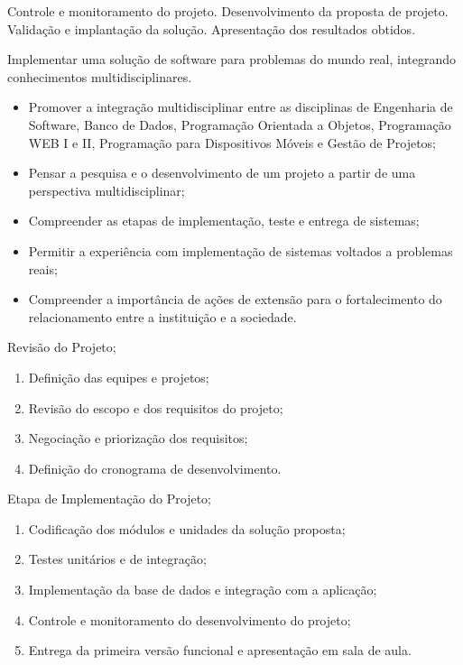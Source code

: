 \begin{pud}
	
	\ementa
	Controle e monitoramento do projeto. Desenvolvimento da proposta de projeto. Validação e implantação da solução. Apresentação dos resultados obtidos.

	\objetivos
	Implementar uma solução de software para problemas do mundo real, integrando conhecimentos multidisciplinares.
	
	\begin{itemize}
	  \item Promover a integração multidisciplinar entre as disciplinas de Engenharia de Software, Banco de Dados, Programação Orientada a Objetos, Programação WEB I e II, Programação para Dispositivos Móveis e Gestão de Projetos;
		\item Pensar a pesquisa e o desenvolvimento de um projeto a partir de uma perspectiva multidisciplinar;
		\item Compreender as etapas de implementação, teste e entrega de sistemas;
		\item Permitir a experiência com implementação de sistemas voltados a problemas reais;
		\item Compreender a importância de ações de extensão para o fortalecimento do relacionamento entre a instituição e a sociedade.
	\end{itemize}


	\programa
	\begin{description}[itemsep=0em]
 		\item[UNIDADE I:] Revisão do Projeto; 
 	    \begin{enumerate}[itemsep=0em, topsep=0em]
 			\item Definição das equipes e projetos;
 			\item Revisão do escopo e dos requisitos do projeto;
 			\item Negociação e priorização dos requisitos;
 			\item Definição do cronograma de desenvolvimento.
		\end{enumerate}
		
		\item[UNIDADE II:] Etapa de Implementação do Projeto; 
 	    \begin{enumerate}[itemsep=0em, topsep=0em]
 			\item Codificação dos módulos e unidades da solução proposta;
 			\item Testes unitários e de integração;
 			\item Implementação da base de dados e integração com a aplicação;
 			\item Controle e monitoramento do desenvolvimento do projeto;
 			\item Entrega da primeira versão funcional e apresentação em sala de aula.
		\end{enumerate}
		

\end{description}
\end{pud}
